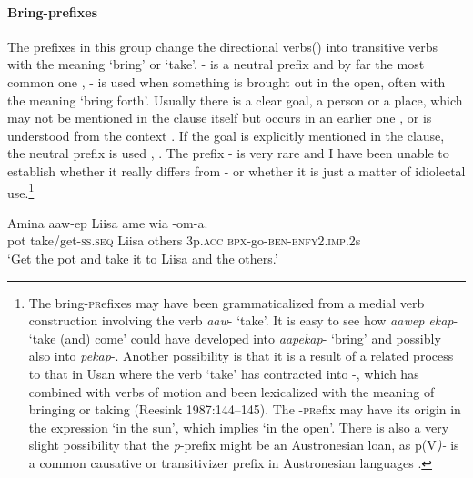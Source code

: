 \paragraph{Bring-prefixes}\label{sec:3.8.2.4.2}
{}
The prefixes in this group change the directional verbs\linebreak () into transitive verbs with the meaning `bring' or `take'. \nobreakdash- is a neutral prefix and by far the most common one , \nobreakdash- is used when something is brought out in the open, often with the meaning `bring forth'. Usually there is a clear goal, a person or a place, which may not be mentioned in the clause itself but occurs in an earlier one , or is understood from the context . If the goal is explicitly mentioned in the clause, the neutral prefix is used , . The prefix \nobreakdash-  is very rare and I have been unable to establish whether it really differs from \nobreakdash- or whether it is just a matter of idiolectal use.\footnote{The bring\nobreakdash-\textsc{pr}efixes may have been grammaticalized from a medial verb construction involving the verb \textit{aaw}\nobreakdash- `take'. It is easy to see how \textit{aawep ekap}\nobreakdash- `take (and) come' could have developed into \textit{aapekap}\nobreakdash- `bring' and possibly also into \textit{pekap}-. Another possibility is that it is a result of a related process to that in Usan where the verb  `take' has contracted into \nobreakdash-, which has combined with verbs of motion and been lexicalized with the meaning of bringing or taking ({Reesink 1987}:144--145). The \nobreakdash-\textsc{pr}efix may have its origin in the expression  `in the sun', which implies `in the open'. There is also a very slight possibility that the \textit{p}\nobreakdash-prefix might be an Austronesian loan, as p(V\textit{)\nobreakdash-} is a common causative or transitivizer prefix in Austronesian languages \citep[61]{Bugenhagen1995}. }

\ea%
\label{ex:3:x221}
\gll Amina aaw-ep Liisa ame wia -om-a.\\
pot take/get-\textsc{ss}.\textsc{seq} Liisa others 3p.\textsc{acc} \textsc{bpx}-go-\textsc{ben}-\textsc{bnfy}2.\textsc{imp}.2s\\
\glt`Get the pot and take it to Liisa and the others.' 
\z

